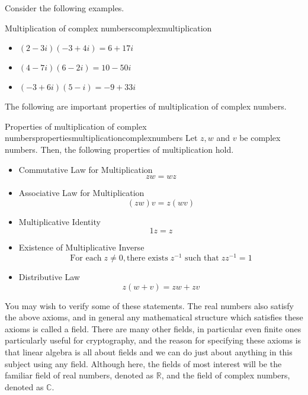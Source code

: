 Consider the following examples.

\begin{example}{Multiplication of complex numbers}{complexmultiplication}
\begin{itemize}
\item $(2-3i)(-3+4i) = 6+17i$
\item $(4-7i)(6-2i) = 10-50i$
\item $(-3+6i)(5-i) = -9+33i$
\end{itemize}
\end{example}

The following are important properties of multiplication of complex numbers.

\begin{theorem}{Properties of multiplication of complex numbers}{propertiesmultiplicationcomplexnumbers}
Let $z,w$ and $v$ be complex numbers. Then, the following properties of multiplication hold.

\begin{itemize}

\item Commutative Law for Multiplication
\begin{equation*}
zw=wz
\end{equation*}

\item Associative Law for Multiplication
\begin{equation*}
\left( zw\right) v=z\left( wv\right) 
\end{equation*}

\item Multiplicative Identity
\begin{equation*}
1z=z
\end{equation*}

\item Existence of Multiplicative Inverse
\begin{equation*}
\mbox{For each}\; z\neq 0, \mbox{there exists}\; z^{-1} \mbox{ such that}\; zz^{-1}=1
\end{equation*}

\item Distributive Law
\begin{equation*}
z\left( w+v\right) =zw+zv
\end{equation*}
\end{itemize}
\end{theorem}

You may wish to verify some of these statements.  The real numbers
also satisfy the above axioms, and in general any mathematical
structure which satisfies these axioms is called a field. There are
many other fields, in particular even finite ones particularly useful
for cryptography, and the reason for specifying these axioms is that
linear algebra is all about fields and we can do just about anything
in this subject using any field. Although here, the fields of most
interest will be the familiar field of real numbers, denoted as
$\mathbb{R}$, and the field of complex numbers, denoted as
$\mathbb{C}$.

